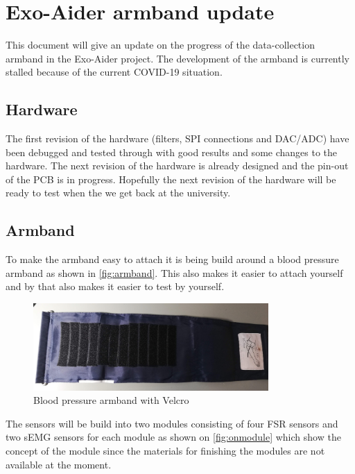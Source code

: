 



\section{Exo-Aider armband update}

This document will give an update on the progress of the data-collection armband in the Exo-Aider project. The development of the armband is currently stalled because of the current COVID-19 situation. 



\subsection{Hardware}
The first revision of the hardware (filters, SPI connections and DAC/ADC) have been debugged and tested through with good results and some changes to the hardware. The next revision of the hardware is already designed and the pin-out of the PCB is in progress. Hopefully the next revision of the hardware will be ready to test when the we get back at the university.  


\subsection{Armband}
To make the armband easy to attach it is being build around a blood pressure armband as shown in \autoref{fig:armband}. This also makes it easier to attach yourself and by that also makes it easier to test by yourself. 

\begin{figure}[htbp]
    \centering
    \includegraphics[width=0.8\textwidth]{figures/armband.jpg}
    \caption{Blood pressure armband with Velcro}
    \label{fig:armband}
\end{figure}

The sensors will be build into two modules consisting of four FSR sensors and two sEMG sensors for each module as shown on \autoref{fig:onmodule} which show the concept of the module since the materials for finishing the modules are not available at the moment. 

